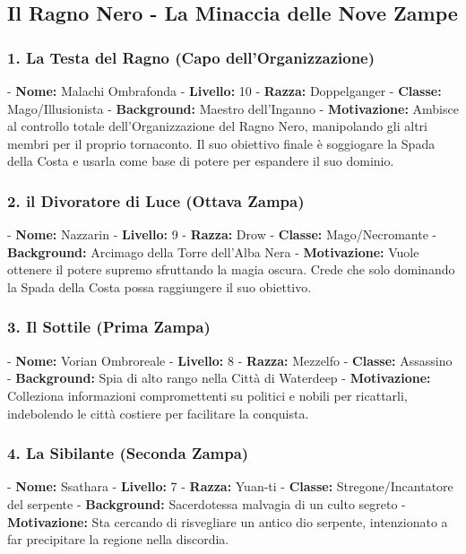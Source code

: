\documentclass{article}
\begin{document}
\subsection*{Il Ragno Nero - La Minaccia delle Nove Zampe}

\subsubsection*{1. La Testa del Ragno (Capo dell'Organizzazione)}
   - \textbf{Nome:} Malachi Ombrafonda
   - \textbf{Livello:} 10
   - \textbf{Razza:} Doppelganger
   - \textbf{Classe:} Mago/Illusionista
   - \textbf{Background:} Maestro dell'Inganno
   - \textbf{Motivazione:} Ambisce al controllo totale dell'Organizzazione del Ragno Nero, manipolando gli altri membri per il proprio tornaconto. Il suo obiettivo finale è soggiogare la Spada della Costa e usarla come base di potere per espandere il suo dominio.

\subsubsection*{2. il Divoratore di Luce (Ottava Zampa) }
   - \textbf{Nome:} Nazzarin
   - \textbf{Livello:} 9
   - \textbf{Razza:} Drow
   - \textbf{Classe:} Mago/Necromante
   - \textbf{Background:} Arcimago della Torre dell'Alba Nera
   - \textbf{Motivazione:} Vuole ottenere il potere supremo sfruttando la magia oscura. Crede che solo dominando la Spada della Costa possa raggiungere il suo obiettivo.

\subsubsection*{3. Il Sottile (Prima Zampa)}
   - \textbf{Nome:} Vorian Ombroreale
   - \textbf{Livello:} 8
   - \textbf{Razza:} Mezzelfo
   - \textbf{Classe:} Assassino
   - \textbf{Background:} Spia di alto rango nella Città di Waterdeep
   - \textbf{Motivazione:} Colleziona informazioni compromettenti su politici e nobili per ricattarli, indebolendo le città costiere per facilitare la conquista.

\subsubsection*{4. La Sibilante (Seconda Zampa)}
   - \textbf{Nome:} Ssathara
   - \textbf{Livello:} 7
   - \textbf{Razza:} Yuan-ti
   - \textbf{Classe:} Stregone/Incantatore del serpente
   - \textbf{Background:} Sacerdotessa malvagia di un culto segreto
   - \textbf{Motivazione:} Sta cercando di risvegliare un antico dio serpente, intenzionato a far precipitare la regione nella discordia.
\end{document}
